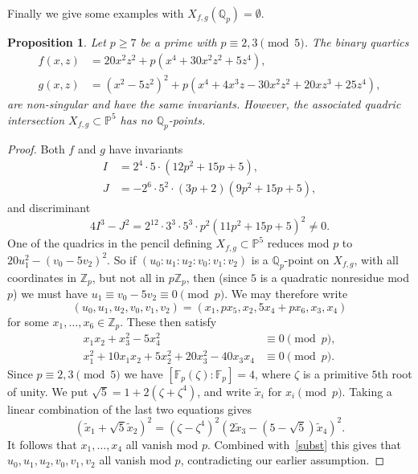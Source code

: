 \documentclass[12pt]{amsart}
\newcommand{\PP}{{\mathbb P}}
\newcommand{\F}{{\mathbb F}}
\newcommand{\Q}{{\mathbb Q}}
\newcommand{\Z}{{\mathbb Z}}
\newtheorem{Proposition}{Proposition}[section]
\theoremstyle{definition}
\begin{document}
Finally we give some examples with $X_{f,g}(\Q_p) = \emptyset$.
\begin{Proposition} Let $p \geqslant 7$ be
  a prime with $p \equiv 2,3 \pmod{5}$. The binary
  quartics 
\begin{align*}
  f(x,z) &= 20 x^2 z^2 + p (x^4 + 30 x^2 z^2 + 5 z^4),  \\
  g(x,z) &= (x^2 - 5 z^2)^2 + p (x^4 + 4 x^3 z - 30 x^2 z^2
    + 20 x z^3 + 25 z^4),
\end{align*}
are non-singular and have the same invariants. However, the associated
quadric intersection $X_{f,g} \subset \PP^5$ has no $\Q_p$-points.
\end{Proposition}
\begin{proof}
  Both $f$ and $g$ have invariants
  \begin{align*}
 I &= 2^4 \cdot 5 \cdot(12 p^2 + 15 p + 5), \\
     J &= -2^6 \cdot 5^2 \cdot(3 p + 2) (9 p^2 + 15 p + 5),
  \end{align*}
  and discriminant
  \[ 4 I^3 - J^2 = 2^{12} \cdot 3^3 \cdot 5^3 \cdot p^2
    (11 p^2 + 15 p + 5)^2 \not = 0. \]
  One of the quadrics in the pencil defining $X_{f,g} \subset \PP^5$ reduces
  mod $p$ to $20 u_1^2 - (v_0 - 5 v_2)^2$. So if
  $(u_0:u_1:u_2:v_0:v_1:v_2)$ is a $\Q_p$-point on $X_{f,g}$, with all
  coordinates in $\Z_p$, but not all in $p\Z_p$, then (since
  $5$ is a quadratic nonresidue mod $p$) we must have
  $u_1 \equiv v_0 - 5 v_2 \equiv 0 \pmod{p}$. We may
  therefore write
  \begin{equation}
  \label{subst}
  (u_0,u_1,u_2,v_0,v_1,v_2) = (x_1, p x_5, x_2, 5 x_4 + p x_6, x_3, x_4)
  \end{equation}
  for some $x_1, \ldots, x_6 \in \Z_p$. These then satisfy
  \begin{align*}
      x_1 x_2 + x_3^2 - 5 x_4^2 &\equiv 0 \pmod{p}, \\
    x_1^2 + 10 x_1 x_2 + 5 x_2^2 + 20 x_3^2 - 40 x_3 x_4 &\equiv 0 \pmod{p}.
  \end{align*}
  Since $p \equiv 2,3 \pmod{5}$ we have $[\F_p(\zeta):\F_p] = 4$,
  where $\zeta$ is a primitive $5$th root of unity. We put $\sqrt{5} =
  1 + 2(\zeta + \zeta^4)$, and write $\widetilde{x}_i$ for $x_i \pmod{p}$.
  Taking a linear
  combination of the last two equations gives 
  \[  (\widetilde{x}_1 + \sqrt{5} \widetilde{x}_2)^2
    = (\zeta - \zeta^4)^2 (2 \widetilde{x}_3
    - (5 - \sqrt{5}) \widetilde{x}_4)^2. \]
  It follows that $x_1, \ldots, x_4$ all vanish mod $p$. Combined
  with~\eqref{subst} this gives that $u_0, u_1,u_2,v_0,v_1, v_2$ all vanish
  mod $p$, contradicting our earlier assumption.
 \end{proof}
\end{document}

